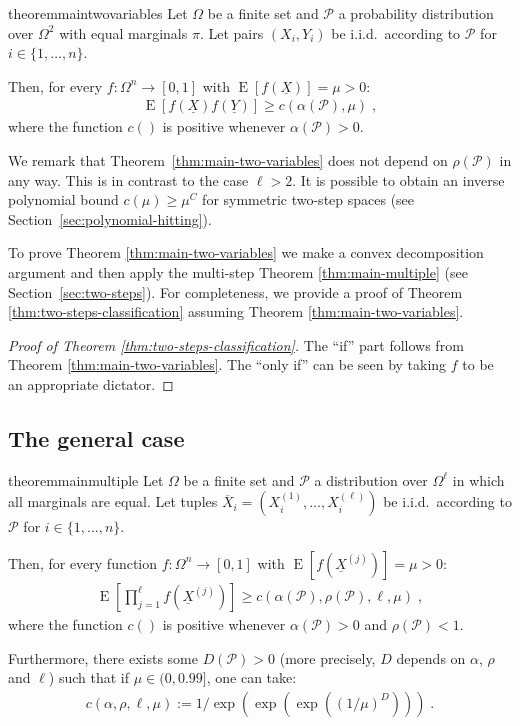\documentclass{daj}
\newcommand{\1}{\mathbbm{1}}
\theoremstyle{plain}
\theoremstyle{definition}
\DeclareMathOperator*{\EE}{E}
\newcommand{\cP}{\mathcal{P}}
\begin{document}
\begin{restatable}{theorem}{maintwovariables}
\label{thm:main-two-variables}
Let $\Omega$ be a finite set and
$\mathcal{P}$ a probability distribution over $\Omega^2$ 
with equal marginals $\pi$.
Let pairs $(X_i, Y_i)$ 
be i.i.d.~according to $\mathcal{P}$ for 
$i \in \{1,\ldots,n\}$.

Then, for every $f: \Omega^n \to [0,1]$ with 
$\EE[f(\underline{X})] = \mu > 0$:
\begin{align}
\EE [f(\underline{X})f(\underline{Y})] 
\geq c\left (\alpha(\mathcal{P}), \mu \right) \; ,
\end{align}
where the function $c()$ is positive whenever
$\alpha(\mathcal{P})> 0$.
\end{restatable}
We remark that Theorem~\ref{thm:main-two-variables} does not depend
on $\rho(\mathcal{P})$ in any way. 
This is in contrast to the case $\ell > 2$.
It is possible to obtain an inverse polynomial bound
$c(\mu) \ge \mu^C$
for symmetric two-step spaces (see Section~\ref{sec:polynomial-hitting}).

To prove Theorem \ref{thm:main-two-variables} we make
a convex decomposition argument and then apply
the multi-step Theorem \ref{thm:main-multiple}
(see Section~\ref{sec:two-steps}).
For completeness, we provide a proof of 
Theorem \ref{thm:two-steps-classification} assuming Theorem
\ref{thm:main-two-variables}.
\begin{proof}[Proof of Theorem \ref{thm:two-steps-classification}]
The ``if'' part follows from Theorem \ref{thm:main-two-variables}.
The ``only if'' can be seen by taking $f$ to be an appropriate dictator. 
\end{proof}

\subsection{The general case}

\begin{restatable}{theorem}{mainmultiple}
\label{thm:main-multiple}
Let $\Omega$ be a finite set and $\cP$ a distribution over $\Omega^{\ell}$ in
which all marginals are equal.  Let tuples
$\overline{X}_i = (X_i^{(1)}, \ldots, X_i^{(\ell)})$ be i.i.d.~according to
$\mathcal{P}$ for $i \in \{1,\ldots,n\}$.

Then, for every function $f: \Omega^n \to [0,1]$
with $\EE[f(\underline{X}^{(j)})] = \mu > 0$:
\begin{align}
  \EE \left[ \prod_{j=1}^\ell f(\underline{X}^{(j)}) \right]
  \geq c\left(\alpha(\mathcal{P}), \rho(\mathcal{P}), \ell, \mu \right) \; ,
\end{align}
where the function $c()$ is positive whenever $\alpha(\mathcal{P})>0$
and $\rho(\mathcal{P}) < 1$.

Furthermore, there exists some $D(\mathcal{P}) > 0$
(more precisely, $D$ depends on 
$\alpha$, $\rho$ and $\ell$) such that
if $\mu \in (0, 0.99]$, one can take:
\begin{align}
\label{eq:76a}
  c(\alpha, \rho, \ell, \mu) := 1 / \exp\left(\exp\left(\exp\left(
  \left(1/\mu\right)^D
  \right)\right)\right) \; .
\end{align}
\end{restatable}
\end{document}
